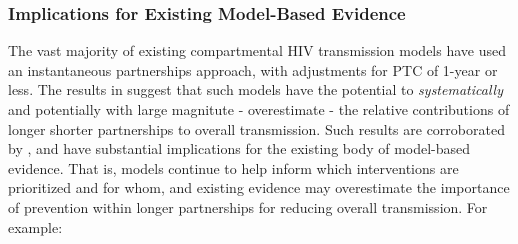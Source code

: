 \subsubsection{Implications for Existing Model-Based Evidence}\label{foi.disc.bip.evid}  %
The vast majority of existing compartmental HIV transmission models
have used an instantaneous partnerships approach,
with adjustments for PTC of 1-year or less.
The results in  suggest that such models
have the potential to  \emph{systematically} and potentially with large magnitute - overestimate - %
the relative contributions of longer \vs shorter partnerships to overall transmission.
Such results are corroborated by \cite{Johnson2016mf},
and have substantial implications for the existing body of model-based evidence.
That is, models continue to help inform which interventions are prioritized and for whom,
and existing evidence may overestimate the importance of prevention within longer partnerships  %
for reducing overall transmission. For example:
